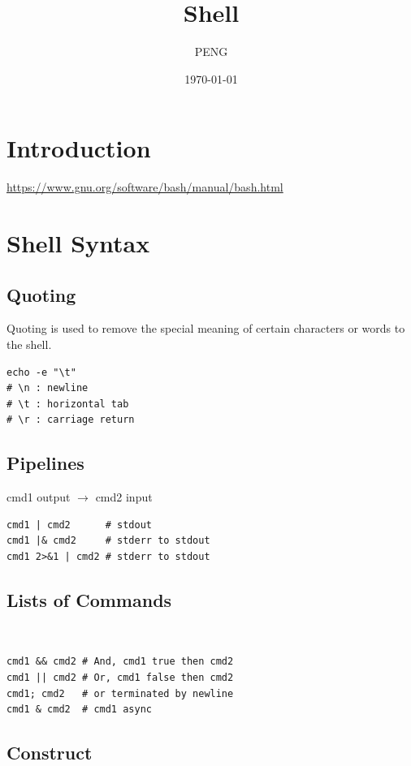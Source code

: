\documentclass{article}
\title{Shell}
\author{PENG}
\date{\today}
\begin{document}
\maketitle
\tableofcontents
\section{Introduction}
\url{https://www.gnu.org/software/bash/manual/bash.html}

\section{Shell Syntax}
\subsection{Quoting}
\begin{definition}[quoting]
    Quoting is used to remove the special meaning of certain characters or words to the shell.
    \begin{verbatim}
echo -e "\t"
# \n : newline
# \t : horizontal tab
# \r : carriage return
\end{verbatim}
\end{definition}

\subsection{Pipelines}
\begin{definition}[pipeline]
    cmd1 output $\to$ cmd2 input
    \begin{verbatim}
cmd1 | cmd2      # stdout
cmd1 |& cmd2     # stderr to stdout
cmd1 2>&1 | cmd2 # stderr to stdout
\end{verbatim}
\end{definition}

\subsection{Lists of Commands}
\begin{definition}[list]~
    \begin{verbatim}
cmd1 && cmd2 # And, cmd1 true then cmd2
cmd1 || cmd2 # Or, cmd1 false then cmd2
cmd1; cmd2   # or terminated by newline
cmd1 & cmd2  # cmd1 async
\end{verbatim}
\end{definition}

\subsection{Construct}
\end{document}
